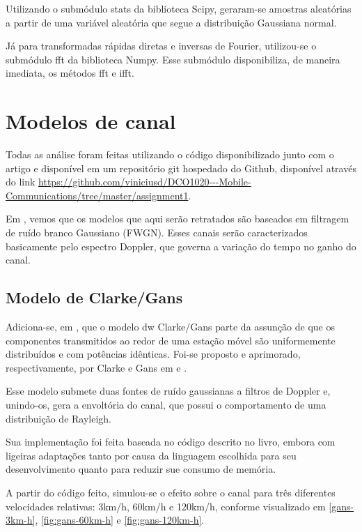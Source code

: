 \documentclass[journal,11pt,twocolumn]{IEEEtran}
\begin{document}
Utilizando o submódulo stats da biblioteca Scipy, geraram-se amostras aleatórias a partir de uma variável aleatória que segue a distribuição Gaussiana normal.

Já para transformadas rápidas diretas e inversas de Fourier, utilizou-se o submódulo fft da biblioteca Numpy. Esse submódulo disponibiliza, de maneira imediata, os métodos fft e ifft.

\section{Modelos de canal}
Todas as análise foram feitas utilizando o código disponibilizado junto com o artigo e disponível em um repositório git hospedado do Github, disponível através do link \url{https://github.com/viniciusd/DCO1020---Mobile-Communications/tree/master/assignment1}.

Em \cite{mimo}, vemos que os modelos que aqui serão retratados são baseados em filtragem de ruído branco Gaussiano (FWGN). Esses canais serão caracterizados basicamente pelo espectro Doppler, que governa a variação do tempo no ganho do canal.
\subsection{Modelo de Clarke/Gans}

Adiciona-se, em \cite{mimo}, que o modelo dw Clarke/Gans parte da assunção de que os componentes transmitidos ao redor de uma estação móvel são uniformemente distribuídos e com potências idênticas. Foi-se proposto e aprimorado, respectivamente, por Clarke e Gans em \cite{clarke} e \cite{gans}.

Esse modelo submete duas fontes de ruído gaussianas a filtros de Doppler e, unindo-os, gera a envoltória do canal, que possui o comportamento de uma distribuição de Rayleigh.

Sua implementação foi feita baseada no código descrito no livro, embora com ligeiras adaptações tanto por causa da linguagem escolhida para seu desenvolvimento quanto para reduzir sue consumo de memória.

A partir do código feito, simulou-se o efeito sobre o canal para três diferentes velocidades relativas: 3km/h, 60km/h e 120km/h, conforme visualizado em \ref{gans-3km-h}, \ref{fig:gans-60km-h} e \ref{fig:gans-120km-h}.
\end{document}
